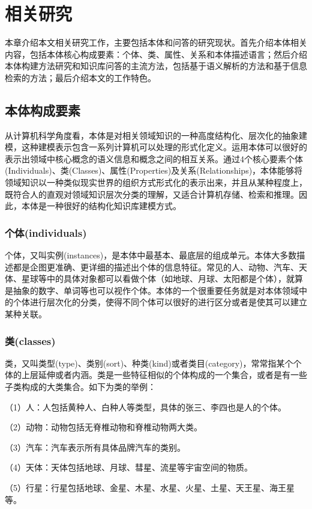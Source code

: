 \chapter{相关研究}
本章介绍本文相关研究工作，主要包括本体和问答的研究现状。首先介绍本体相关内容，包括本体核心构成要素：个体、类、属性、关系和本体描述语言；然后介绍本体构建方法研究和知识库问答的主流方法，包括基于语义解析的方法和基于信息检索的方法；最后介绍本文的工作特色。

\section{本体构成要素}
从计算机科学角度看，本体是对相关领域知识的一种高度结构化、层次化的抽象建模，这种建模表示包含一系列计算机可以处理的形式化定义\cite{Hitzler}。运用本体可以很好的表示出领域中核心概念的语义信息和概念之间的相互关系。通过4个核心要素个体(Individuals)、类(Classes)、属性(Properties)及关系(Relationships)，本体能够将领域知识以一种类似现实世界的组织方式形式化的表示出来，并且从某种程度上，既符合人的直观对领域知识层次分类的理解，又适合计算机存储、检索和推理。因此，本体是一种很好的结构化知识库建模方式。

\subsection{个体(individuals)}
个体，又叫实例(instances)，是本体中最基本、最底层的组成单元。本体大多数描述都是企图更准确、更详细的描述出个体的信息特征。常见的人、动物、汽车、天体、星球等中的具体对象都可以看做个体（如地球、月球、太阳都是个体），就算是抽象的数字、单词等也可以视作个体。本体的一个很重要任务就是对本体领域中的个体进行层次化的分类，使得不同个体可以很好的进行区分或者是使其可以建立某种关联。

\subsection{类(classes)}
类，又叫类型(type)、类别(sort)、种类(kind)或者类目(category)，常常指某个个体的上层延伸或者内涵。类是一些特征相似的个体构成的一个集合，或者是有一些子类构成的大类集合。如下为类的举例：

（1）人：人包括黄种人、白种人等类型，具体的张三、李四也是人的个体。

（2）动物：动物包括无脊椎动物和脊椎动物两大类。

（3）汽车：汽车表示所有具体品牌汽车的类别。

（4）天体：天体包括地球、月球、彗星、流星等宇宙空间的物质。

（5）行星：行星包括地球、金星、木星、水星、火星、土星、天王星、海王星等。

